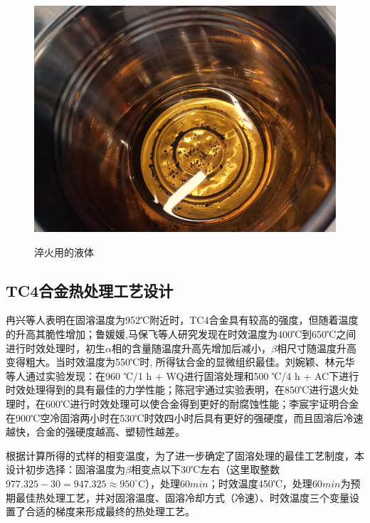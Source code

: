 \begin{figure}[h!]
{		\includegraphics[scale=0.4]{pic/淬火油}}
	\caption{淬火用的液体}
	\label{fig:淬火用液体}
\end{figure}
\subsection{TC4合金热处理工艺设计}

冉兴等人表明\cite{ranxingGurongwenduduiTi6Al4VELItaihejinxianweizuzhijixingnengdeyingxiang2021}在固溶温度为952℃附近时，TC4合金具有较高的强度，但随着温度的升高其脆性增加；鲁媛媛,马保飞\cite{luyuanyuanShixiaochuliduiTC4taihejinweiguanzuzhihelixuexingnengdeyingxiang2019}等人研究发现在时效温度为400℃到650℃之间进行时效处理时，初生$ \alpha $相的含量随温度升高先增加后减小，$\beta$相尺寸随温度升高变得粗大。当时效温度为550℃时, 所得钛合金的显微组织最佳。刘婉颖、林元华等人通过实验发现：在960 ℃/1 h + WQ进行固溶处理和500 ℃/4 h + AC下进行时效处理得到的\ti 具有最佳的力学性能\cite{LiuWanYingBuTongReChuLiGongYiDuiTi6Al4VTaiHeJinWeiGuanJieGouHeLiXueXingNengYingXiangYingWen2017}；陈冠宇通过实验表明，在850℃进行退火处理时，在600℃进行时效处理可以使合金得到更好的耐腐蚀性能\cite{1200}；李宸宇证明\ti 合金在900℃空冷固溶两小时在530℃时效四小时后具有更好的强硬度，而且固溶后冷速越快，合金的强硬度越高、塑韧性越差\cite{900}。%

根据计算所得的式样的相变温度，为了进一步确定了固溶处理的最佳工艺制度，本设计初步选择：固溶温度为$ \beta $相变点以下30℃左右（这里取整数$ 977.325-30=947.325\approx950^{\circ} \mathrm{C} $），处理$60min$；时效温度450℃，处理$60min$为预期最佳热处理工艺，并对固溶温度、固溶冷却方式（冷速）、时效温度三个变量设置了合适的梯度来形成最终的热处理工艺。

